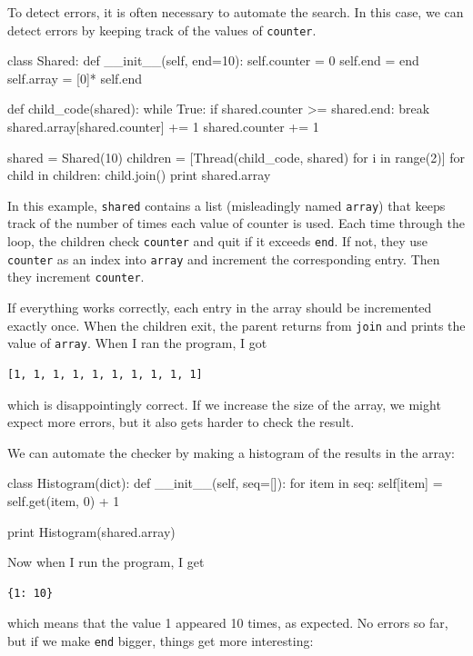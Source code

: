 \documentclass{book}
\begin{document}
To detect errors, it is often necessary to automate the search.
In this case, we can detect errors by keeping track of the values
of {\tt counter}.

\pagebreak
\begin{unbreakable}[title={}]{}
class Shared:
  def __init__(self, end=10):
    self.counter = 0
    self.end = end
    self.array = [0]* self.end

def child_code(shared):
  while True:
    if shared.counter >= shared.end: break
    shared.array[shared.counter] += 1
    shared.counter += 1

shared = Shared(10)
children = [Thread(child_code, shared) 
  for i in range(2)]
for child in children: child.join()
print shared.array
\end{unbreakable}

In this example, {\tt shared} contains a list (misleadingly
named {\tt array}) that keeps track of the number of times
each value of counter is used.
Each time through the loop, the children check {\tt counter}
and quit if it exceeds {\tt end}.  If not, they use {\tt counter}
as an index into {\tt array} and increment the corresponding
entry.  Then they increment {\tt counter}.

If everything works correctly, each entry in the array should
be incremented exactly once.  When the children exit, the parent
returns from {\tt join} and prints the value of {\tt array}.
When I ran the program, I got
%
\begin{verbatim}
[1, 1, 1, 1, 1, 1, 1, 1, 1, 1]
\end{verbatim}
%
which is disappointingly correct.  If we increase the size of
the array, we might expect more errors, but it also gets harder
to check the result.


We can automate the checker by making
a histogram of the results in the array:

\begin{unbreakable}[title={}]{}
class Histogram(dict):
  def __init__(self, seq=[]):
    for item in seq:
      self[item] = self.get(item, 0) + 1

print Histogram(shared.array)
\end{unbreakable}

Now when I run the program, I get

\begin{verbatim}
{1: 10}
\end{verbatim}
%
which means that the value 1 appeared 10 times, as expected.  No
errors so far, but if we make {\tt end} bigger, things get more
interesting:
\end{document}
